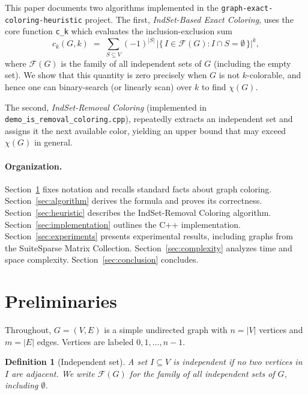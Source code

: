 \documentclass[11pt]{article}
\newtheorem{definition}{Definition}
\begin{document}
This paper documents two algorithms implemented in the
\texttt{graph-exact-coloring-heuristic} project.
The first, \emph{IndSet-Based Exact Coloring}, uses the core function
\texttt{c\_k} which evaluates the inclusion-exclusion sum
\[
  c_k(G,k) \;=\; \sum_{S \subseteq V} (-1)^{|S|}\,
                  \bigl|\{\,I \in \mathcal{F}(G) : I \cap S = \emptyset\,\}\bigr|^k,
\]
where $\mathcal{F}(G)$ is the family of all independent sets of $G$ (including
the empty set).  We show that this quantity is zero precisely when $G$ is not
$k$-colorable, and hence one can binary-search (or linearly scan) over $k$ to
find $\chi(G)$.

The second, \emph{IndSet-Removal Coloring} (implemented in
\texttt{demo\_is\_removal\_coloring.cpp}), repeatedly extracts an independent set
and assigns it the next available color, yielding an upper bound that may
exceed $\chi(G)$ in general.

\paragraph{Organization.}
Section~\ref{sec:prelim} fixes notation and recalls standard facts about graph
coloring.  Section~\ref{sec:algorithm} derives the formula and proves its
correctness.  Section~\ref{sec:heuristic} describes the IndSet-Removal Coloring algorithm.
Section~\ref{sec:implementation} outlines the C++ implementation.
Section~\ref{sec:experiments} presents experimental results, including
graphs from the SuiteSparse Matrix Collection.
Section~\ref{sec:complexity} analyzes time and space complexity.
Section~\ref{sec:conclusion} concludes.

\section{Preliminaries}\label{sec:prelim}

Throughout, $G = (V, E)$ is a simple undirected graph with $n = |V|$ vertices
and $m = |E|$ edges.  Vertices are labeled $0, 1, \ldots, n-1$.

\begin{definition}[Independent set]
  A set $I \subseteq V$ is \emph{independent} if no two vertices in $I$ are
  adjacent.  We write $\mathcal{F}(G)$ for the family of all independent sets
  of $G$, including $\emptyset$.
\end{definition}
\end{document}
